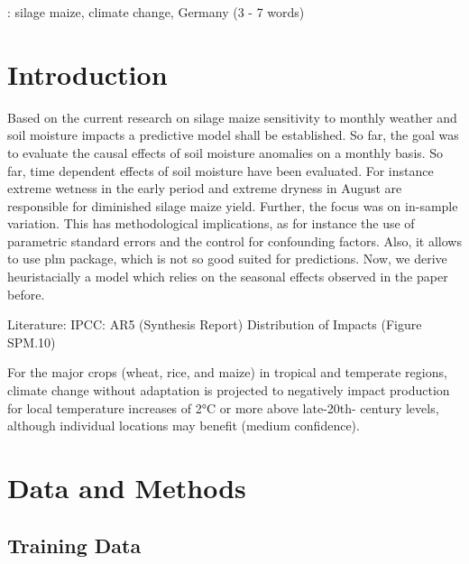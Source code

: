 \documentclass[12pt]{iopart}
\begin{document}
: silage maize, climate change, Germany (3 - 7 words)


\submitto{\ERL}
\maketitle


\section{Introduction}
Based on the current research on silage maize sensitivity to monthly weather and soil moisture impacts  a predictive model shall be established.  So far, the goal was to evaluate the causal effects of soil moisture anomalies on a monthly basis. So far, time dependent effects of soil moisture have been evaluated. For instance extreme wetness in the early period and extreme dryness in August are responsible for diminished silage maize yield.  Further, the focus was on in-sample variation. This has methodological implications, as for instance the use of parametric standard errors and the control for confounding factors. Also, it allows to use plm package, which is not so good suited for predictions. 
Now, we derive heuristacially a model which relies on the seasonal effects observed in the paper before. 

Literature:
IPCC: AR5 (Synthesis Report)
Distribution of Impacts (Figure SPM.10)

For the major crops (wheat, rice, and maize) in tropical and temperate regions, climate change without adaptation is projected to negatively impact production for local temperature increases of 2°C or more above late-20th- century levels, although individual locations may benefit (medium confidence).



\section{Data and Methods}
\subsection{Training Data}
\end{document}
